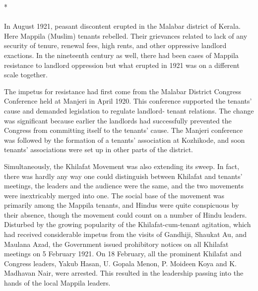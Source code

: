 \begin{center}*\end{center}

\paragraph*{}


In August 1921, peasant discontent erupted in the Malabar district of Kerala. Here Mappila (Muslim) tenants rebelled. Their grievances related to lack of any security of tenure, renewal fees, high rents, and other oppressive landlord exactions. In the nineteenth century as well, there had been cases of Mappila resistance to landlord oppression but what erupted in 1921 was on a different scale together.

The impetus for resistance had first come from the Malabar District Congress Conference held at Manjeri in April 1920. This conference supported the tenants' cause and demanded legislation to regulate landlord- tenant relations. The change was significant because earlier the landlords had successfully prevented the Congress from committing itself to the tenants' cause. The Manjeri conference was followed by the formation of a tenants' association at Kozhikode, and soon tenants' associations were set up in other parts of the district.

Simultaneously, the Khilafat Movement was also extending its sweep. In fact, there was hardly any way one could distinguish between Khilafat and tenants' meetings, the leaders and the audience were the same, and the two movements were inextricably merged into one. The social base of the movement was primarily among the Mappila tenants, and Hindus were quite conspicuous by their absence, though the movement could count on a number of Hindu leaders. Disturbed by the growing popularity of the Khilafat-cum-tenant agitation, which had received considerable impetus from the visits of Gandhiji, Shaukat Au, and Maulana Azad, the Government issued prohibitory notices on all Khilafat meetings on 5 February 1921. On 18 February, all the prominent Khilafat and Congress leaders, Yakub Hasan, U. Gopala Menon, P. Moideen Koya and K. Madhavan Nair, were arrested. This resulted in the leadership passing into the hands of the local Mappila leaders.

